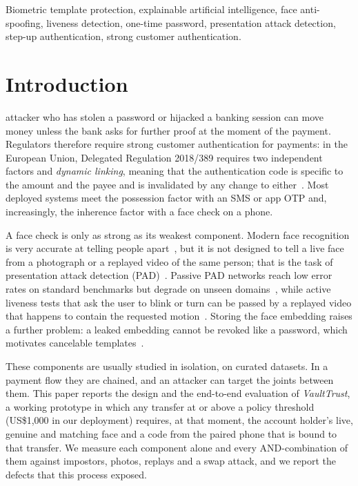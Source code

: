 \documentclass{ieeeaccess}
\begin{document}
\begin{keywords}
Biometric template protection, explainable artificial intelligence, face anti-spoofing, liveness
detection, one-time password, presentation attack detection, step-up authentication, strong customer
authentication.
\end{keywords}

\titlepgskip=-21pt

\maketitle

\section{Introduction}
\label{sec:introduction}
 attacker who has stolen a password or hijacked a banking session can move money unless
the bank asks for further proof at the moment of the payment. Regulators therefore require strong
customer authentication for payments: in the European Union, Delegated Regulation 2018/389 requires two
independent factors and \emph{dynamic linking}, meaning that the authentication code is specific to the
amount and the payee and is invalidated by any change to either~\cite{psd2rts}. Most deployed systems
meet the possession factor with an SMS or app OTP and, increasingly, the inherence factor with a face
check on a phone.

A face check is only as strong as its weakest component. Modern face recognition is very accurate at
telling people apart~\cite{arcface}, but it is not designed to tell a live face from a photograph or a
replayed video of the same person; that is the task of presentation attack detection
(PAD)~\cite{iso30107,fas_survey}. Passive PAD networks reach low error rates on standard benchmarks
but degrade on unseen domains~\cite{cdcn,ssdg}, while active liveness tests that ask the user to blink
or turn can be passed by a replayed video that happens to contain the requested motion~\cite{pan2007}.
Storing the face embedding raises a further problem: a leaked embedding cannot be revoked like a
password, which motivates cancelable templates~\cite{ratha2001,iso24745}.

These components are usually studied in isolation, on curated datasets. In a payment flow they are
chained, and an attacker can target the joints between them. This paper reports the design and the
end-to-end evaluation of \emph{VaultTrust}, a working prototype in which any transfer at or above a
policy threshold (US\$1,000 in our deployment) requires, at that moment, the account holder's live,
genuine and matching face and a code from the paired phone that is bound to that transfer. We measure
each component alone and every AND-combination of them against impostors, photos, replays and a swap
attack, and we report the defects that this process exposed.
\end{document}
